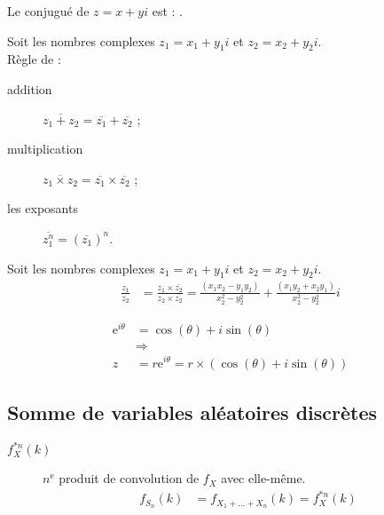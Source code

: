 \documentclass[10pt, french]{article}
\begin{document}
\begin{multicols*}{2}
\begin{definitionNOHFILLprop}
Le conjugué de $z	=	x + yi$ est : .

\begin{definitionNOHFILLpropos}
Soit les nombres complexes $z_{1}	=	x_{1} + y_{1}i$ et $z_{2}	=	x_{2} + y_{2}i$.\\
Règle de : 
\begin{description}
	\item[addition]	$\overline{z_{1} + z_{2}}	=	\overline{z_{1}} + \overline{z_{2}}$ ;
	\item[multiplication]	$\overline{z_{1} \times z_{2}}	=	\overline{z_{1}} \times \overline{z_{2}}$ ;
	\item[les exposants]		$\overline{z_{1}^{n}}	=	\left(\overline{z_{1}}\right)^{n}$.
\end{description}
\end{definitionNOHFILLpropos}
\end{definitionNOHFILLprop}


\begin{definitionNOHFILLpropos}
Soit les nombres complexes $z_{1}	=	x_{1} + y_{1}i$ et $z_{2}	=	x_{2} + y_{2}i$.\\
\begin{align*}
	\frac{z_{1}}{z_{2}}
	&=	\frac{z_{1} \times \overline{z_{2}}}{z_{2} \times \overline{z_{2}}}
	=	\frac{(x_{1}x_{2} - y_{1}y_{2})}{x_{2}^{2} - y_{2}^{2}} + \frac{(x_{1}y_{2} + x_{2}y_{1})}{x_{2}^{2} - y_{2}^{2}}i
\end{align*}
\end{definitionNOHFILLpropos}

\begin{definitionNOHFILLprop}
\begin{align*}
	\textrm{e}^{i\theta}
	&=	\cos(\theta) + i\sin(\theta)	\\
	&\Rightarrow	\\
	z
	&=	r\textrm{e}^{i\theta}
	=	r\times\left(\cos(\theta) + i\sin(\theta)\right)
\end{align*}
\end{definitionNOHFILLprop}

\columnbreak
\subsection{Somme de variables aléatoires discrètes}
\begin{distributions}[Notation]
\begin{description}
	\item[$f_{X}^{\ast n}(k)$]	$n^{\text{e}}$ produit de convolution de $f_{X}$ avec elle-même.	
		\begin{align*}
			f_{S_{n}}(k)	
			&=	f_{X_{1} + \dots + X_{n}}(k)	=	f_{X}^{\ast n}(k)
		\end{align*}
\end{description}
\end{distributions}


\end{multicols*}
\end{document}
